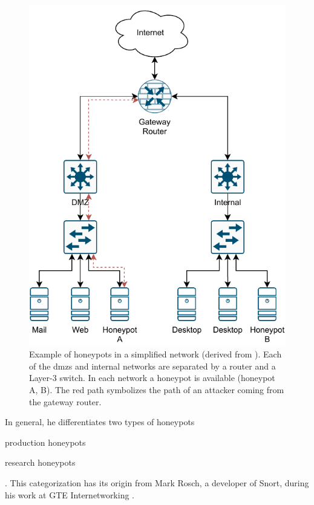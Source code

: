 \begin{figure}
    \centering
    \includegraphics{figures/honeypot-example.pdf}
    \caption[Example of honeypots in a simplified network]{
        Example of honeypots in a simplified network (derived from \cite{Spitzner2003}).
        Each of the \acp{dmz} and internal networks are separated by a router and a Layer-3 switch.
        In each network a honeypot is available (honeypot A, B).
        The red path symbolizes the path of an attacker coming from the gateway router.
    }
    \label{fig:honeypot-example}
\end{figure}

In general, he differentiates two types of honeypots
\begin{enumerate*}[label=(\roman*)]
    \item production honeypots
    \item research honeypots
\end{enumerate*}.
This categorization has its origin from Mark Rosch, a developer of Snort, during his work at GTE Internetworking \cite{vetterl2020}.

